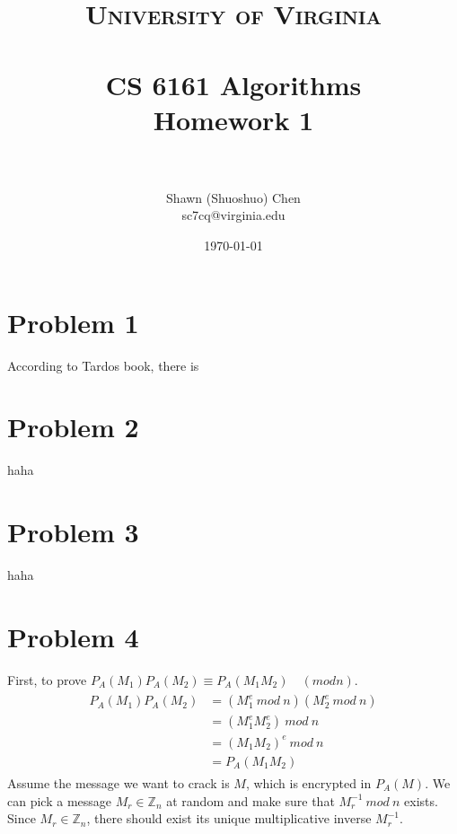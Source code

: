 \documentclass[titlepage, paper=a4, fontsize=11pt]{scrartcl} %
\title{	
\normalfont \normalsize 
\textsc{University of Virginia} \\ [25pt] %
\horrule{0.5pt} \\[0.4cm] %
\huge CS 6161 Algorithms \\
\huge Homework 1 \\ %
\horrule{2pt} \\[0.5cm] %
}
\author{Shawn (Shuoshuo) Chen\\sc7cq@virginia.edu} %
\date{\normalsize\today} %
\numberwithin{equation}{section} %
\numberwithin{figure}{section} %
\numberwithin{table}{section} %
\begin{document}
\maketitle %


\section*{Problem 1}
According to Tardos book, there is 
\\



\section*{Problem 2}
haha
\\



\section*{Problem 3}
haha
\\



\section*{Problem 4}
First, to prove $P_A(M_1)P_A(M_2) \equiv P_A(M_1M_2) \quad (mod n)$.
\begin{align*} 
\begin{split}
P_A(M_1)P_A(M_2) &= (M_1^e \  mod \ n )(M_2^e \  mod \ n ) \\
&= (M_1^eM_2^e) \ mod \ n \\
&= (M_1M_2)^e \ mod \ n \\
&= P_A(M_1M_2)
\end{split}					
\end{align*}
Assume the message we want to crack is $M$, which is encrypted in $P_A(M)$.
We can pick a message $M_r \in \mathbb{Z}_n$ at random and make sure that $M_{r}^{-1} \ mod \ n$ exists.
Since $M_r \in \mathbb{Z}_n$, there should exist its unique multiplicative inverse $M_r^{-1}$. \\
\end{document}
